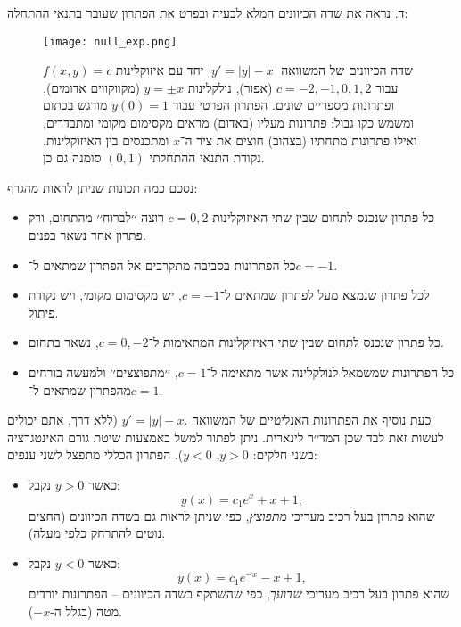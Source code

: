 \documentclass{article}
\numberwithin{equation}{section}
\begin{document}
ד.
נראה את שדה הכיוונים המלא לבעיה ובפרט את הפתרון שעובר בתנאי ההתחלה:
\begin{figure}[H]
    \centering
    \texttt{[image: null\_exp.png]}
    \caption{שדה הכיוונים של המשוואה 
    \(\; y' = |y| - x \;\) 
    יחד עם איזוקלינות \(f(x,y)=c\) עבור \(c=-2,-1,0,1,2\) (אפור), 
    נולקלינות \(y=\pm x\) (מקווקווים אדומים), ופתרונות מספריים שונים. 
    הפתרון הפרטי עבור \(y(0)=1\) מודגש בכתום ומשמש כקו גבול: פתרונות מעליו (באדום) מראים מקסימום מקומי ומתבדרים, 
    ואילו פתרונות מתחתיו (בצהוב) חוצים את ציר ה־\(x\) ומתכנסים בין האיזוקלינות. 
    נקודת התנאי ההתחלתי \((0,1)\) סומנה גם כן.}
    \label{fig:dirfield_abs_d_matlab}
\end{figure}
נסכם כמה תכונות שניתן לראות מהגרף:
\begin{itemize}
  \item כל פתרון שנכנס לתחום שבין שתי האיזוקלינות $c=0,2$ רוצה ׳׳לברוח׳׳ מהתחום, ורק פתרון אחד נשאר בפנים.  

  \item כל הפתרונות בסביבה מתקרבים אל הפתרון שמתאים ל־$c=-1$.  

  \item לכל פתרון שנמצא מעל לפתרון שמתאים ל־$c=-1$, יש מקסימום מקומי, ויש נקודת פיתול.  

  \item כל פתרון שנכנס לתחום שבין שתי האיזוקלינות המתאימות ל־$c=0,-2$, נשאר בתחום.  

  \item כל הפתרונות שמשמאל לנולקלינה אשר מתאימה ל־$c=1$, ׳׳מתפוצצים׳׳ ולמעשה בורחים מהפתרון שמתאים ל־$c=1$.
\end{itemize}

כעת נוסיף את הפתרונות האנליטיים של המשוואה \(
y' = |y| - x.
\) (ללא דרך, אתם יכולים לעשות זאת לבד שכן המד׳׳ר לינארית. ניתן לפתור למשל באמצעות שיטת גורם האינטגרציה בשני חלקים: $y>0$, $y<0$).
הפתרון הכללי מתפצל לשני ענפים:  

\begin{itemize}
  \item כאשר $y>0$ נקבל:
  \[
  y(x) = c_1 e^{x} + x + 1,
  \]
  שהוא פתרון בעל רכיב מעריכי \emph{מתפוצץ}, כפי שניתן לראות גם בשדה הכיוונים (החצים נוטים להתרחק כלפי מעלה).
  
  \item כאשר $y<0$ נקבל:
  \[
  y(x) = c_1 e^{-x} - x + 1,
  \]
  שהוא פתרון בעל רכיב מעריכי \emph{שדועך}, כפי שהשתקף בשדה הכיוונים – הפתרונות יורדים מטה (בגלל ה-$-x$).
\end{itemize}
\end{document}

